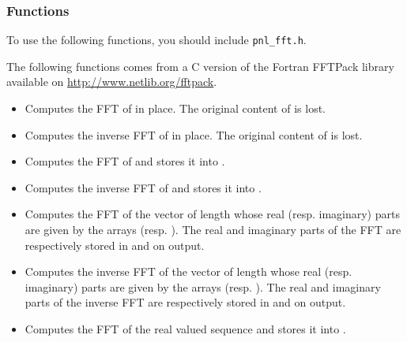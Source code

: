 \subsubsection{Functions}

To use the following functions, you should include \verb!pnl_fft.h!.

The following functions comes from a C version of the Fortran FFTPack library
available on \url{http://www.netlib.org/fftpack}.
\begin{itemize}
\item {}
  \sshortdescribe Computes the FFT of  in place. The original content
  of  is lost.

\item {}
  \sshortdescribe Computes the inverse FFT of  in place. The
  original content of  is lost.

\item {}
  \sshortdescribe Computes the FFT of  and stores it into .

\item {}
  \sshortdescribe Computes the inverse FFT of  and stores it into .

\item {}
  \sshortdescribe Computes the FFT of the vector of length  whose real
  (resp. imaginary) parts are given by the arrays 
  (resp. ). The real and imaginary parts of the FFT are respectively
  stored in  and  on output.

\item {}
  \sshortdescribe Computes the inverse FFT of the vector of length 
  whose real (resp. imaginary) parts are given by the arrays 
  (resp. ). The real and imaginary parts of the inverse FFT are
  respectively stored in  and  on output.

\item {}
  \sshortdescribe Computes the FFT of the real valued sequence  and
  stores it into .


\end{itemize}
